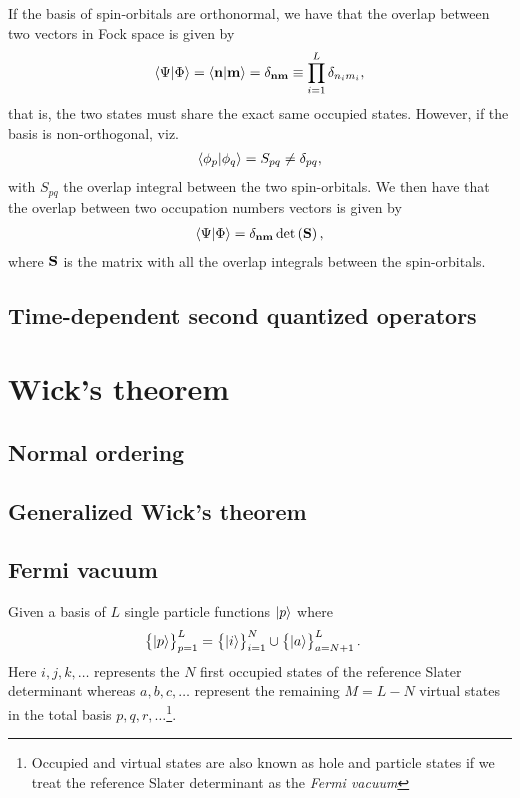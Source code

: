             If the basis of spin-orbitals are orthonormal, we have that the
            overlap between two vectors in Fock space is given by
            \begin{align}
                \langle \Psi | \Phi \rangle
                = \langle \mathbf{n} | \mathbf{m} \rangle
                = \delta_{\mathbf{n}\mathbf{m}}
                \equiv \prod_{i = 1}^{L} \delta_{n_i m_i},
            \end{align}
            that is, the two states must share the exact same occupied states.
            However, if the basis is non-orthogonal, viz.
            \begin{align}
                \langle \phi_p | \phi_q \rangle = S_{pq} \neq \delta_{pq},
            \end{align}
            with $S_{pq}$ the overlap integral between the two spin-orbitals.
            We then have that the overlap between two occupation numbers vectors
            is given by
            \begin{align}
                \langle \Psi | \Phi \rangle
                = \delta_{\mathbf{n}\mathbf{m}}\det\left( \mathbf{S} \right),
            \end{align}
            where $\mathbf{S}$ is the matrix with all the overlap integrals between
            the spin-orbitals.
        \subsection{Time-dependent second quantized operators}


    \section{Wick's theorem}
        \subsection{Normal ordering}
        \subsection{Generalized Wick's theorem}
        \subsection{Fermi vacuum}
            \label{sec:fermi-vacuum}
            Given a basis of $L$ single particle functions $| p \rangle$ where
            \begin{align}
                \left\{| p \rangle\right\}_{p = 1}^{L}
                &=
                \left\{| i \rangle\right\}_{i = 1}^{N}
                \cup \left\{| a \rangle\right\}_{a = N + 1}^{L}.
            \end{align}
            Here $i, j, k, \dots$ represents the $N$ first occupied states of
            the reference Slater determinant whereas $a, b, c, \dots$ represent
            the remaining $M = L - N$ virtual states in the total basis $p, q,
            r, \dots$\footnote{Occupied and virtual states are also known as
            hole and particle states if we treat the reference Slater
            determinant as the \textit{Fermi vacuum}}.

